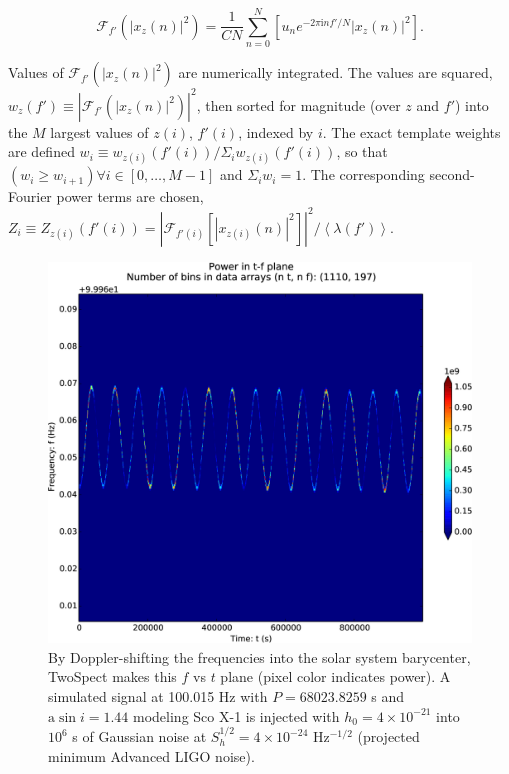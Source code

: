 \begin{equation}
\mathcal{F}_{f'}(\left|x_z(n) \right|^2) = \frac{1}{CN} \sum\limits_{n=0}^N \left[u_n e^{-2\pi \mathrm{i} n f'/N} \left|x_z(n)\right|^2\right].
\label{fourier_transform_of_tfplane_power}
\end{equation}

Values of $\mathcal{F}_{f'}(\left|x_z(n) \right|^2)$ are numerically integrated.
The values are squared, $w_{z}(f') \equiv \left| \mathcal{F}_{f'}(\left|x_z(n) \right|^2) \right|^2$, then sorted for magnitude (over $z$ and $f'$) into the $M$ largest values of $z(i)$, $f'(i)$, indexed by $i$.
The exact template weights are defined $w_i \equiv w_{z(i)}\left(f'(i)\right) / \Sigma_i w_{z(i)} \left(f'(i) \right)$, so that $(w_i \geq w_{i+1}) \forall i\in [0,\ldots, M-1]$ and $\Sigma_i w_i = 1$.
The corresponding second-Fourier power terms are chosen, $Z_i \equiv Z_{z(i)}\left(f'(i)\right) = \left|\mathcal{F}_{f'(i)}[|x_{z(i)}(n)|^2] \right|^2/\left<\lambda(f') \right>$.


\begin{figure}
\begin{center}
\includegraphics[keepaspectratio,height=0.35\paperheight]{plots/tfplane-4e21-on-4e24.eps}
\caption{By Doppler-shifting the frequencies into the solar system barycenter, TwoSpect makes this $f$ vs $t$ plane (pixel color indicates power). A simulated signal at 100.015 Hz with $P = 68023.8259$ s and $\mathrm{a} \sin i = 1.44$ modeling Sco X-1 is injected with $h_0 = 4\times 10^{-21}$ into $10^6$ s of Gaussian noise at $S^{1/2}_{h} = 4 \times 10^{-24}$ Hz$^{-1/2}$ (projected minimum Advanced LIGO noise).}
\label{tfplane-figure}
\end{center}
\end{figure}

